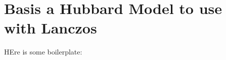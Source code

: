 \documentclass{report}
\begin{document}
\begin{comment}
\begin{flushleft} \small
\begin{minipage}{\linewidth}\label{scrap1}\raggedright\small
\NWtarget{nuweb?}{} \verb@"BasisHubbardLanczos.h"@\nobreak\ {\footnotesize {?}}$\equiv$
\vspace{-1ex}
\begin{lstlisting}%AAAA
    
  /*  
  */  
   \end{lstlisting}
\end{minipage}
\end{flushleft}
\end{comment}

\section{Basis a Hubbard Model to use with Lanczos}

HEre is some boilerplate:
\end{document}
